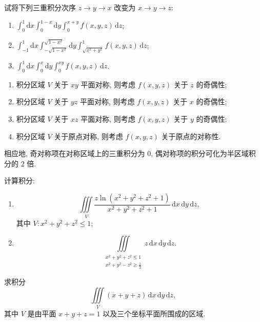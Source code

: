 \documentclass[../../数学分析培优讲义.tex]{subfiles}
\begin{document}
\begin{example}[\markstar]
试将下列三重积分次序 $z\to y\to x$ 改变为 $x\to y\to z$:
\begin{enumerate}[label=(\arabic*)]
    \item $\displaystyle\int_0^1\mathrm{d}x\int_0^{1-x}\mathrm{d}y\int_0^{x+y}f(x,y,z)\,\mathrm{d}z$;
    \item $\displaystyle\int_{-1}^1\mathrm{d}x\int_{-\sqrt{1-x^2}}^{\sqrt{1-x^2}}\mathrm{d}y\int_{\sqrt{x^2+y^2}}^1f(x,y,z)\,\mathrm{d}z$;
    \item $\displaystyle\int_0^1\mathrm{d}x\int_0^x\mathrm{d}y\int_0^{xy}f(x,y,z)\,\mathrm{d}z$.
\end{enumerate}
\end{example}
\exampleblank

\begin{theorem}
\begin{enumerate}[label=(\arabic*)]
    \item 积分区域 $V$ 关于 $xy$ 平面对称, 则考虑 $f(x,y,z)$ 关于 $z$ 的奇偶性;
    \item 积分区域 $V$ 关于 $yz$ 平面对称, 则考虑 $f(x,y,z)$ 关于 $x$ 的奇偶性;
    \item 积分区域 $V$ 关于 $xz$ 平面对称, 则考虑 $f(x,y,z)$ 关于 $y$ 的奇偶性;
    \item 积分区域 $V$ 关于原点对称, 则考虑 $f(x,y,z)$ 关于原点的对称性.
\end{enumerate}
相应地, 奇对称项在对称区域上的三重积分为 $0$, 偶对称项的积分可化为半区域积分的 $2$ 倍.
\end{theorem}

\begin{example}
计算积分:
\begin{enumerate}[label=(\arabic*)]
    \item
    \[
        \iiint\limits_V\dfrac{z\ln(x^2+y^2+z^2+1)}{x^2+y^2+z^2+1}\,\mathrm{d}x\,\mathrm{d}y\,\mathrm{d}z,
    \]
    其中 $V:x^2+y^2+z^2\leq1$;
    \item
    \[
        \iiint\limits_{\substack{x^2+y^2+z^2\leq1\\x^2+y^2-z^2\geq\frac{1}{2}}}z\,\mathrm{d}x\,\mathrm{d}y\,\mathrm{d}z.
    \]
\end{enumerate}
\end{example}
\exampleblank

\begin{example}
求积分
\[
    \iiint\limits_V(x+y+z)\,\mathrm{d}x\,\mathrm{d}y\,\mathrm{d}z,
\]
其中 $V$ 是由平面 $x+y+z=1$ 以及三个坐标平面所围成的区域.
\end{example}
\exampleblank
\end{document}
